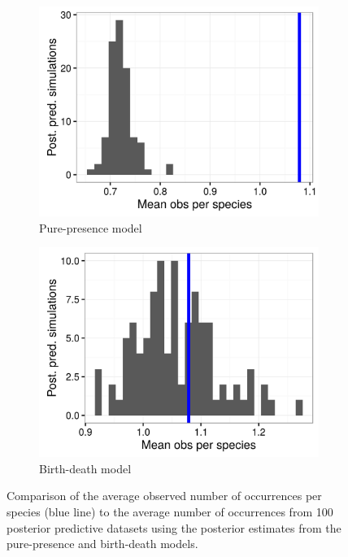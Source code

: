 \documentclass[12pt,letterpaper]{article}
\begin{document}
\begin{figure}[ht]
  \begin{subfigure}[b]{0.45\textwidth}
    \includegraphics[width=\textwidth,height=0.4\textheight,keepaspectratio=true]{figure/pred_occ}
    \caption{Pure-presence model}
    \label{fig:ppc_pure_presence}
  \end{subfigure}
  \begin{subfigure}[b]{0.45\textwidth}
    \includegraphics[width=\textwidth,height=0.4\textheight,keepaspectratio=true]{figure/pred_occ_bd}
    \caption{Birth-death model}
    \label{fig:ppc_birth_death}
  \end{subfigure}
  \caption[Posterior predictive check of average occurrence]{Comparison of the average observed number of occurrences per species (blue line) to the average number of occurrences from 100 posterior predictive datasets using the posterior estimates from the pure-presence and birth-death models.}
  \label{fig:ppc}
\end{figure}
\end{document}
